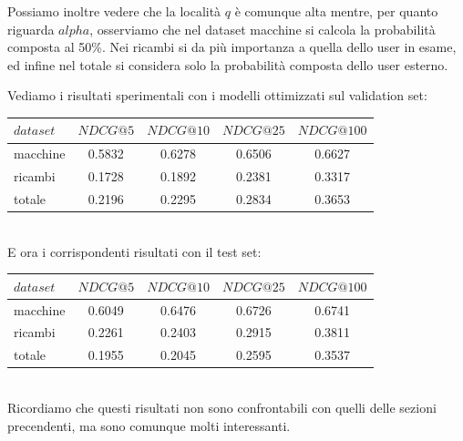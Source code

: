 Possiamo inoltre vedere che la località $q$ è comunque alta mentre, per quanto riguarda $alpha$, osserviamo che nel dataset macchine si calcola la probabilità composta al 50\%. Nei ricambi si da più importanza a quella dello user in esame, ed infine nel totale si considera solo la probabilità composta dello user esterno.

Vediamo i risultati sperimentali con i modelli ottimizzati sul validation set:\\

\begin{tabular}{|l|cccc|}
    \toprule
    $dataset$  &  $NDCG@5$ & $NDCG@10$  & $NDCG@25$ & $NDCG@100$  \\
    \midrule
    macchine & 0.5832 & 0.6278 & 0.6506 & 0.6627 \\
    ricambi & 0.1728 & 0.1892 & 0.2381 & 0.3317 \\
    totale  & 0.2196 & 0.2295 & 0.2834 & 0.3653 \\
\bottomrule
\end{tabular}\\

E ora i corrispondenti risultati con il test set:\\

\begin{tabular}{|l|cccc|}
    \toprule
    $dataset$  &  $NDCG@5$ & $NDCG@10$  & $NDCG@25$ & $NDCG@100$  \\
    \midrule
    macchine & 0.6049 & 0.6476 & 0.6726 & 0.6741 \\
    ricambi & 0.2261 & 0.2403 & 0.2915 & 0.3811 \\
    totale  & 0.1955 & 0.2045 & 0.2595 & 0.3537 \\
\bottomrule
\end{tabular}\\

Ricordiamo che questi risultati non sono confrontabili con quelli delle sezioni precendenti, ma sono comunque molti interessanti.